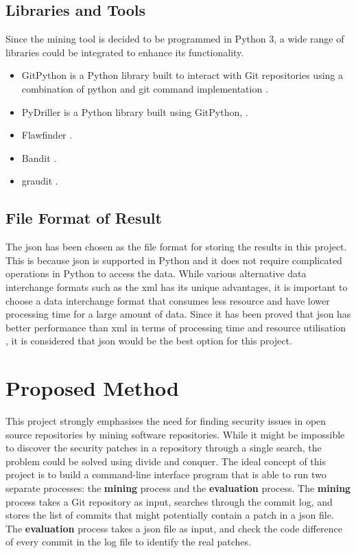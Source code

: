\documentclass[12pt, a4paper]{report}
\begin{document}
\subsection{Libraries and Tools}
Since the mining tool is decided to be programmed in Python 3, a wide range of libraries could be
integrated to enhance its functionality.
\begin{itemize}
	\item GitPython is a Python library built to interact with Git repositories using a combination of
  python and git command implementation \cite{gitpython}.
  \item PyDriller is a Python library built using GitPython, \cite{pydriller_repo,
  spadini_2018}.
  \item Flawfinder \cite{flawfinder}.
  \item Bandit \cite{bandit}.
  \item graudit \cite{graudit}.
\end{itemize}

\subsection{File Format of Result} \label{subsec:file_format}
The \acrfull{json} \cite{json} has been chosen as the file format for storing the results in this
project. This is because \acrshort{json} is supported in Python and it does not require complicated
operations in Python to access the data. While various alternative data interchange formats such as
the \acrfull{xml} \cite{xml} has its unique advantages, it is important to choose a data interchange
format that consumes less resource and have lower processing time for a large amount of data. Since
it has been proved that \acrshort{json} has better performance than \acrshort{xml} in terms of
processing time and resource utilisation \cite{nurseitov_2009}, it is considered that
\acrshort{json} would be the best option for this project.

\section{Proposed Method}
This project strongly emphasises the need for finding security issues in open source repositories by
mining software repositories. While it might be impossible to discover the security patches in a
repository through a single search, the problem could be solved using divide and conquer. The ideal
concept of this project is to build a command-line interface program that is able to run two
separate processes: the \textbf{mining} process and the \textbf{evaluation} process. The
\textbf{mining} process takes a Git repository as input, searches through the commit log, and stores
the list of commits that might potentially contain a patch in a \acrshort{json} file. The
\textbf{evaluation} process takes a \acrshort{json} file as input, and check the code difference of
every commit in the log file to identify the real patches.
\end{document}
